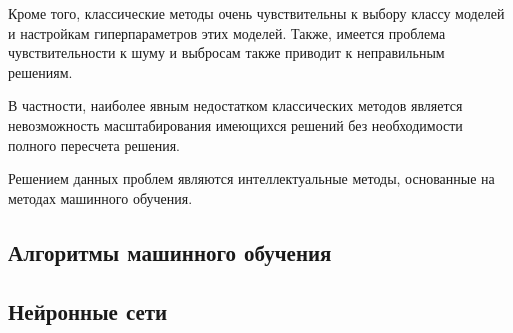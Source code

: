 Кроме того, классические методы очень чувствительны
к выбору классу моделей и настройкам гиперпараметров
этих моделей. Также, имеется проблема
чувствительности к шуму и выбросам также приводит к
неправильным решениям. 

В частности, наиболее явным недостатком классических
методов является невозможность масштабирования
имеющихся решений без необходимости полного
пересчета решения. 

Решением данных проблем являются интеллектуальные
методы, основанные на методах машинного обучения. 

\subsection{Алгоритмы машинного обучения}  

\subsection{Нейронные сети}

